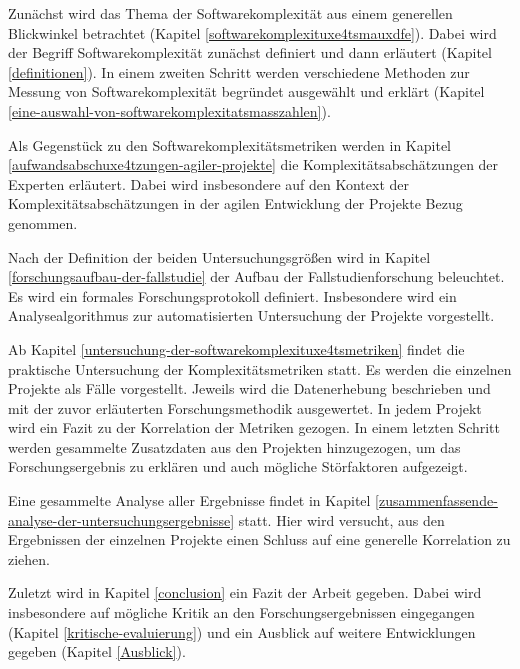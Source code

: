 Zunächst wird das Thema der Softwarekomplexität aus einem generellen
Blickwinkel betrachtet (Kapitel \ref{softwarekomplexituxe4tsmauxdfe}). Dabei wird der Begriff
Softwarekomplexität zunächst definiert und dann erläutert (Kapitel \ref{definitionen}). In einem zweiten Schritt werden verschiedene Methoden zur
Messung von Softwarekomplexität begründet ausgewählt und erklärt
(Kapitel \ref{eine-auswahl-von-softwarekomplexitatsmasszahlen}).

Als Gegenstück zu den Softwarekomplexitätsmetriken werden in Kapitel \ref{aufwandsabschuxe4tzungen-agiler-projekte}
die Komplexitätsabschätzungen der Experten erläutert. Dabei wird
insbesondere auf den Kontext der Komplexitätsabschätzungen in der agilen
Entwicklung der Projekte Bezug genommen.

Nach der Definition der beiden Untersuchungsgrößen wird in Kapitel \ref{forschungsaufbau-der-fallstudie} der
Aufbau der Fallstudienforschung beleuchtet. Es wird ein formales
Forschungsprotokoll definiert. Insbesondere wird ein Analysealgorithmus
zur automatisierten Untersuchung der Projekte vorgestellt.

Ab Kapitel \ref{untersuchung-der-softwarekomplexituxe4tsmetriken} findet die praktische Untersuchung der Komplexitätsmetriken
statt. Es werden die einzelnen Projekte als Fälle vorgestellt. Jeweils
wird die Datenerhebung beschrieben und mit der zuvor erläuterten
Forschungsmethodik ausgewertet. In jedem Projekt wird ein Fazit zu der
Korrelation der Metriken gezogen. In einem letzten Schritt werden
gesammelte Zusatzdaten aus den Projekten hinzugezogen, um das
Forschungsergebnis zu erklären und auch mögliche Störfaktoren
aufgezeigt.

Eine gesammelte Analyse aller Ergebnisse findet in Kapitel \ref{zusammenfassende-analyse-der-untersuchungsergebnisse} statt. Hier
wird versucht, aus den Ergebnissen der einzelnen Projekte einen Schluss
auf eine generelle Korrelation zu ziehen.

Zuletzt wird in Kapitel \ref{conclusion} ein Fazit der Arbeit gegeben. Dabei wird
insbesondere auf mögliche Kritik an den Forschungsergebnissen
eingegangen (Kapitel \ref{kritische-evaluierung}) und ein Ausblick auf weitere Entwicklungen
gegeben (Kapitel \ref{Ausblick}).
